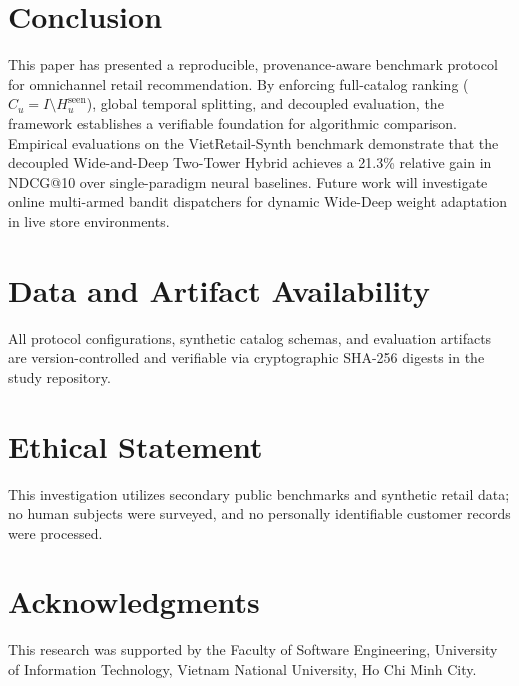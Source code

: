 \documentclass[10pt,a4paper]{article}
\begin{document}
\section{Conclusion}

This paper has presented a reproducible, provenance-aware benchmark protocol for omnichannel retail recommendation. By enforcing full-catalog ranking ($C_u = I \setminus H_u^{\mathrm{seen}}$), global temporal splitting, and decoupled evaluation, the framework establishes a verifiable foundation for algorithmic comparison. Empirical evaluations on the VietRetail-Synth benchmark demonstrate that the decoupled Wide-and-Deep Two-Tower Hybrid achieves a 21.3\% relative gain in NDCG@10 over single-paradigm neural baselines. Future work will investigate online multi-armed bandit dispatchers for dynamic Wide-Deep weight adaptation in live store environments.

\section*{Data and Artifact Availability}
All protocol configurations, synthetic catalog schemas, and evaluation artifacts are version-controlled and verifiable via cryptographic SHA-256 digests in the study repository.

\section*{Ethical Statement}
This investigation utilizes secondary public benchmarks and synthetic retail data; no human subjects were surveyed, and no personally identifiable customer records were processed.

\section*{Acknowledgments}
This research was supported by the Faculty of Software Engineering, University of Information Technology, Vietnam National University, Ho Chi Minh City.



\end{document}
